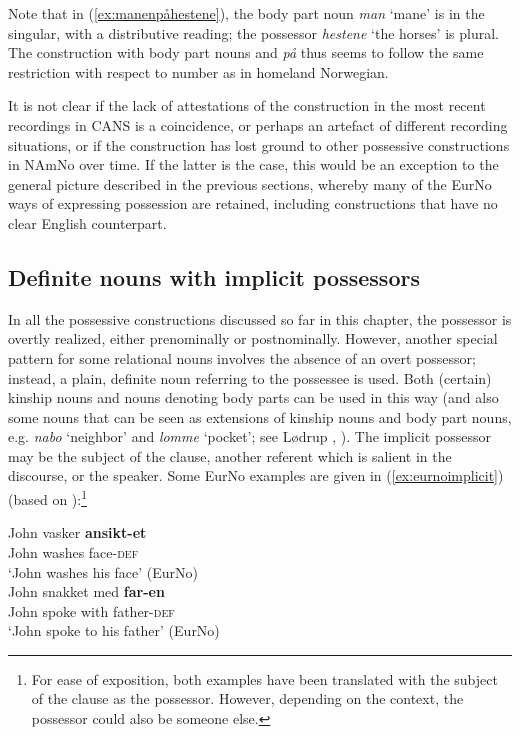 \documentclass[output=paper,colorlinks,citecolor=brown]{langscibook}
\begin{document}
\noindent Note that in (\ref{ex:manenpåhestene}), the body part noun \emph{man} `mane' is in the singular, with a distributive reading; the possessor \emph{hestene} `the horses' is plural. The construction with body part nouns and \emph{på} thus seems to follow the same restriction with respect to number as in homeland Norwegian. 

It is not clear if the lack of attestations of the construction in the most recent recordings in CANS is a coincidence, or perhaps an artefact of different recording situations, or if the construction has lost ground to other possessive constructions in NAmNo over time. If the latter is the case, this would be  an exception to the general picture described in the previous sections, whereby many of the EurNo ways of expressing possession are retained, including constructions that have no clear English counterpart.  




\subsection{Definite nouns with implicit possessors}\label{subsec:implicit}
In all the possessive constructions discussed so far in this chapter, the possessor is overtly realized, either prenominally or postnominally. However, another special pattern for some relational nouns involves the absence of an  overt possessor; instead, a plain, definite noun referring to the possessee is used. Both (certain) kinship nouns and nouns denoting body parts can be used in this way (and also some nouns that can be seen as extensions of kinship nouns and body part nouns, e.g. \emph{nabo} `neighbor' and \emph{lomme} `pocket'; see Lødrup \citeyear{lodrup2010implicit}, \citeyear{lødrup2014kinship}). The implicit possessor may be the subject of the clause, another referent which is salient in the discourse, or the speaker. Some EurNo examples are given in (\ref{ex:eurnoimplicit}) (based on \citealt{lødrup2014kinship}):\footnote{For ease of exposition, both examples have been translated with the subject of the clause as the possessor. However, depending on the context, the possessor could also be someone else.}

\ea \label{ex:eurnoimplicit}
\ea \gll John vasker \textbf{ansikt-et}\\
John washes face-\textsc{def}\\
\glt `John washes his face' (EurNo) \\
\ex \gll John snakket med \textbf{far-en}\\
John spoke with father-\textsc{def}\\
\glt `John spoke to his father' (EurNo) \\
\z 
\z 
\end{document}
